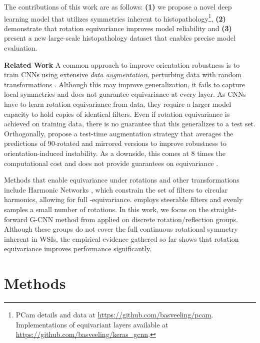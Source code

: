 \documentclass{llncs}
\newcommand{\citet}[1]{\cite{#1}}
\begin{document}
    The contributions of this work are as follows: \textbf{(1)} we propose a novel deep learning model that utilizes symmetries inherent to histopathology\footnote{\label{footnote}PCam details and data at \url{https://github.com/basveeling/pcam}. Implementations of equivariant layers available at \url{https://github.com/basveeling/keras_gcnn}.}, \textbf{(2)} demonstrate that rotation equivariance improves model reliability and \textbf{(3)} present a new large-scale histopathology dataset that enables precise model evaluation.
    
    
\par\textbf{Related Work} A common approach to improve orientation robustness is to train CNNs using extensive \textit{data augmentation}, perturbing data with random transformations \cite{Liu2017-jq,Litjens2017-zt}. Although this may improve generalization, it fails to capture local symmetries and does not guarantee equivariance at every layer. As CNNs have to learn rotation equivariance from data, they require a larger model capacity to hold copies of identical filters. Even if rotation equivariance is achieved on training data, there is no guarantee that this generalizes to a test set. Orthogonally, \citet{Liu2017-jq,Ciresan2013-wv} propose a test-time augmentation strategy that averages the predictions of 90-rotated and mirrored versions to improve robustness to orientation-induced instability. As a downside, this comes at 8 times the computational cost and does not provide guarantees on equivariance \cite{Lenc2015-ih}.

Methods that enable equivariance under rotations and other transformations include Harmonic Networks \cite{Worrall2017-ji}, which constrain the set of filters to circular harmonics, allowing for full -equivariance. \cite{Weiler2017-oz} employs steerable filters and evenly samples a small number of rotations. In this work, we focus on the straight-forward G-CNN method from \citet{Cohen2016-do} applied on discrete rotation/reflection groups. Although these groups do not cover the full continuous rotational symmetry inherent in WSIs, the empirical evidence gathered so far shows that  rotation equivariance improves performance significantly\cite{Weiler2017-oz}. 

\section{Methods}
\end{document}
